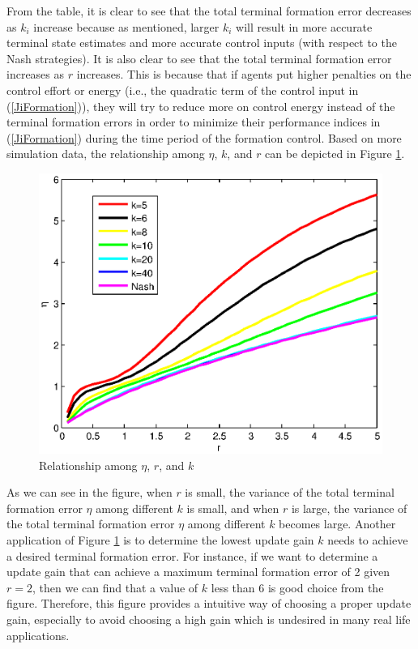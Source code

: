 \documentclass[10pt,doublecolumn]{IEEEtran}  %
\begin{document}
From the table, it is clear to see that the total terminal formation error decreases as $k_i$ increase because as mentioned, larger $k_i$ will result in more accurate terminal state estimates and more accurate control inputs (with respect to the Nash strategies). It is also clear to see that the total terminal formation error increases as $r$ increases. This is because that if agents put higher penalties on the control effort or energy (i.e., the quadratic term of the control input in (\ref{JiFormation})), they will try to reduce more on control energy instead of the terminal formation errors in order to minimize their performance indices in (\ref{JiFormation}) during the time period of the formation control. Based on more simulation data, the relationship among $\eta$, $k$, and $r$ can be depicted in Figure \ref{Relationship}.
\begin{figure}[h]
      \centering
      \includegraphics[scale=0.5]{PlotT.eps}
      \caption{Relationship among $\eta$, $r$, and $k$}\label{Relationship}
\end{figure}
As we can see in the figure, when $r$ is small, the variance of the total terminal formation error $\eta$ among different $k$ is small, and when $r$ is large, the variance of the total terminal formation error $\eta$ among different $k$ becomes large. Another application of Figure \ref{Relationship} is to determine the lowest update gain $k$ needs to achieve a desired terminal formation error. For instance, if we want to determine a update gain that can achieve a maximum terminal formation error of 2 given $r=2$, then we can find that a value of $k$ less than $6$ is good choice from the figure. Therefore, this figure provides a intuitive way of choosing a proper update gain, especially to avoid choosing a high gain which is undesired in many real life applications.
\end{document}
